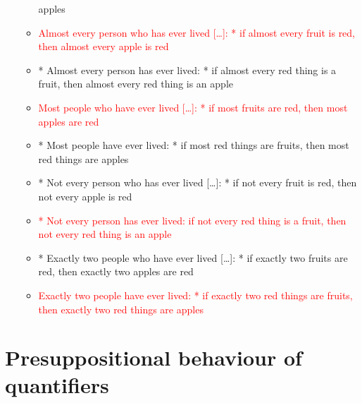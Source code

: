 \documentclass[a4paper]{article}
\begin{document}
\begin{itemize}
\begin{itemize}
    apples
  \item \textcolor{red}{Almost every person who has ever lived [\ldots]: * if almost every fruit is red, then
      almost every apple is red}
  \item * Almost every person has ever lived: * if almost every red thing is a fruit, then almost
    every red thing is an apple
  \item \textcolor{red}{Most people who have ever lived [\ldots]: * if most fruits are red, then most apples are red}
  \item * Most people have ever lived: * if most red things are fruits, then most red things are
    apples
  \item * Not every person who has ever lived [\ldots]: * if not every fruit is red, then not every apple is red
  \item \textcolor{red}{* Not every person has ever lived: if not every red thing is a fruit, then not every
      red thing is an apple}
  \item * Exactly two people who have ever lived [\ldots]: * if exactly two fruits are red, then exactly two
    apples are red
  \item \textcolor{red}{Exactly two people have ever lived: * if exactly two red things are fruits, then exactly two red
    things are apples}
  \end{itemize}
\end{itemize}


\section{Presuppositional behaviour of quantifiers}
\end{document}
